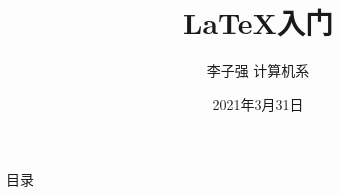 \documentclass{libs/SUSTech_format}
\title[\LaTeX 入门]{\huge \textbf{\LaTeX 入门}}
\author{李子强 \hspace{0.5em}计算机系}
\institute[SUSTech]{
    \normalsize
    南方科技大学
}
\date{2021年3月31日}
\begin{document}



{
    \begin{frame}
    \maketitle
    \end{frame}
}

\begin{frame}{目录}
    \begin{multicols}{2}
        \tableofcontents
    \end{multicols}
\end{frame}





\end{document}
